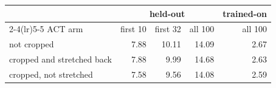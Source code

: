 \begin{tabular}{lrrrr}
\toprule
& \multicolumn{3}{c}{held-out} & trained-on \\
\cmidrule(lr){2-4}\cmidrule(lr){5-5}
ACT arm & first 10 & first 32 & all 100 & all 100 \\
\midrule
not cropped & 7.88 & 10.11 & 14.09 & 2.67 \\
cropped and stretched back & 7.88 & 9.99 & 14.68 & 2.63 \\
cropped, not stretched & 7.58 & 9.56 & 14.08 & 2.59 \\
\bottomrule
\end{tabular}
